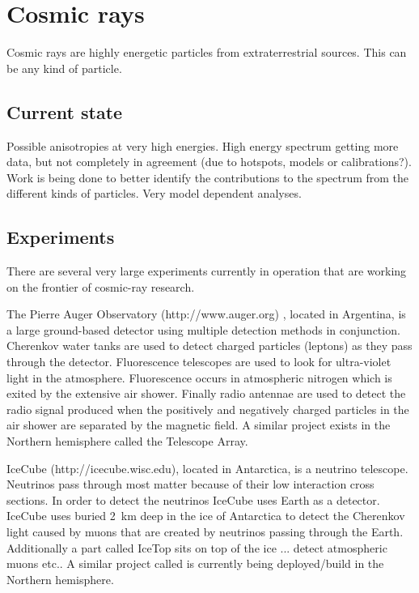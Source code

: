 \chapter{Cosmic rays}
\label{ch:cosmic-rays}

Cosmic rays are highly energetic particles from extraterrestrial sources.
This can be any kind of particle.


\section{Current state}

Possible anisotropies at very high energies. High energy spectrum
getting more data, but not completely in agreement (due to hotspots,
models or calibrations?). Work is being done to better identify the
contributions to the spectrum from the different kinds of particles.
Very model dependent analyses.


\section{Experiments}

There are several very large experiments currently in operation that are
working on the frontier of cosmic-ray research.

The Pierre Auger Observatory (http://www.auger.org)
\cite{auger:prototype}, located in Argentina, is a large ground-based
detector using multiple detection methods in conjunction. Cherenkov
water tanks are used to detect charged particles (leptons) as they pass
through the detector. Fluorescence telescopes are used to look for
ultra-violet light in the atmosphere. Fluorescence occurs in atmospheric
nitrogen which is exited by the extensive air shower. Finally radio
antennae are used to detect the radio signal produced when the
positively and negatively charged particles in the air shower are
separated by the magnetic field. A similar project exists in the
Northern hemisphere called the Telescope Array.

IceCube (http://icecube.wisc.edu), located in Antarctica, is a neutrino
telescope. Neutrinos pass through most matter because of their low
interaction cross sections. In order to detect the neutrinos IceCube
uses Earth as a detector. IceCube uses \pmts buried \SI{2}{\kilo\meter}
deep in the ice of Antarctica to detect the Cherenkov light caused by
muons that are created by neutrinos passing through the Earth.
Additionally a part called IceTop sits on top of the ice ... detect
atmospheric muons etc.. A similar project called \kmnet is currently
being deployed/build in the Northern hemisphere.

